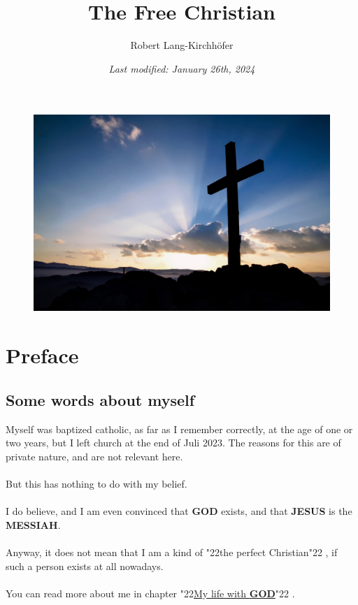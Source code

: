 \documentclass[12pt,a5paper]{article}
\title{\textbf{The Free Christian}}
\author{Robert Lang-Kirchh\"ofer}
\date{\textit{Last modified: January 26th, 2024}}
\newcommand{\God}[0]{\textbf{GOD}}
\newcommand{\Jesus}[0]{\textbf{JESUS}}
\newcommand{\Messiah}[0]{\textbf{MESSIAH}}
\newcommand{\q}[1]{\char"22{#1}\char"22 }
\begin{document}
	\setlength{\parindent}{0mm}
	\maketitle
	\begin{figure}[h]
		\centering
		\includegraphics[width=1\textwidth,keepaspectratio]{"FreeChristian.jpeg"}
	\end{figure}

	\newpage
	\tableofcontents

	\newpage
	\section{Preface}
	
	\subsection{Some words about myself}
		Myself was baptized catholic,
		as far as I remember correctly,
		at the age of one or two years,
		but I left church at the end of Juli 2023.
		The reasons for this are of private nature,
		and are not relevant here.
		\\
		\\
		But this has nothing to do with my belief.
		\\
		\\
		I do believe,
		and I am even convinced that {\God} exists,
		and that {\Jesus} is the {\Messiah}.
		\\
		\\
		Anyway,
		it does not mean that I am a kind of \q{the perfect Christian},
		if such a person exists at all nowadays.
		\\
		\\
		You can read more about me in chapter \q{\hyperref[MeinLebenMitGott]{My life with {\God}}}.
	
\end{document}
